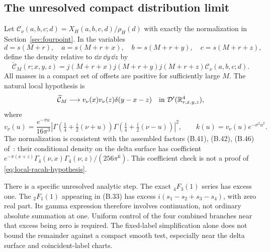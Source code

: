 \subsection{The unresolved compact distribution limit}
Let $\mathcal C_\nu(a,b,c;d)=X_H(a,b,c,d)/\rho_H(d)$ with exactly the
normalization in Section~\ref{sec:fourpoint}. In the variables
\begin{equation}
 d=s(M+r),\quad a=s(M+r+x),\quad
 b=s(M+r+y),\quad c=s(M+r+z),
\end{equation}
define the density relative to $\dd x\,\dd y\,\dd z$ by
\begin{equation}
 \widetilde{\mathcal C}_M(r;x,y,z)
 =j(M+r+x)j(M+r+y)j(M+r+z)\mathcal C_\nu(a,b,c;d).
 \label{eq:translated-cross-density}
\end{equation}
All masses in a compact set of offsets are positive for sufficiently
large $M$. The natural local hypothesis is
\begin{equation}
 \widetilde{\mathcal C}_M
 \longrightarrow v_\nu(x)v_\nu(z)\delta(y-x-z)
 \quad\text{in }\mathcal D'(\mathbb R^4_{r,x,y,z}),
 \label{eq:local-racah-hypothesis}
\end{equation}
where
\begin{equation}
 v_\nu(u)=\frac{e^{-\pi u}}{16\pi^3}
 \left|\Gamma\left(\tfrac14+\tfrac i2(\nu+u)\right)
        \Gamma\left(\tfrac14+\tfrac i2(\nu-u)\right)\right|^2,
 \qquad k(u)=v_\nu(u)e^{-\sigma^2u^2}.
 \label{eq:limit-step-weight}
\end{equation}
The normalization is consistent with the assembled factors (B.41),
(B.42), (B.46) of~\cite{KL}: their conditional density on the delta
surface has coefficient
$e^{-\pi(x+z)}\Gamma_4(\nu,x)\Gamma_4(\nu,z)/(256\pi^6)$.
This coefficient check is not a proof of
\eqref{eq:local-racah-hypothesis}.

There is a specific unresolved analytic step. The exact ${}_4F_3(1)$
series has excess one. The ${}_2F_1(1)$ appearing in (B.33) has
excess $i(s_1-s_2+s_3-s_4)$, with zero real part. Its gamma expression
therefore involves continuation, not ordinary absolute summation at
one. Uniform control of the four combined branches near that excess
being zero is required. The fixed-label simplification alone does not
bound the remainder against a compact smooth test, especially near the
delta surface and coincident-label charts.

